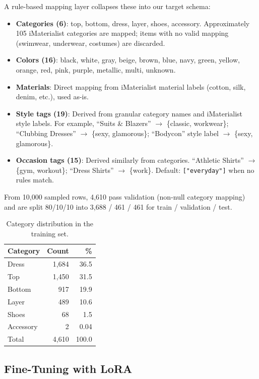\documentclass[10pt,twocolumn]{article}
\begin{document}
A rule-based mapping layer collapses these into our target schema:

\begin{itemize}[leftmargin=*,topsep=2pt,itemsep=1pt]
\item \textbf{Categories (6)}: top, bottom, dress, layer, shoes, accessory.
  Approximately 105 iMaterialist categories are mapped; items with no valid
  mapping (swimwear, underwear, costumes) are discarded.
\item \textbf{Colors (16)}: black, white, gray, beige, brown, blue, navy,
  green, yellow, orange, red, pink, purple, metallic, multi, unknown.
\item \textbf{Materials}: Direct mapping from iMaterialist material labels
  (cotton, silk, denim, etc.), used as-is.
\item \textbf{Style tags (19)}: Derived from granular category names and
  iMaterialist style labels.  For example, ``Suits \& Blazers'' $\to$
  \{classic, workwear\}; ``Clubbing Dresses'' $\to$ \{sexy, glamorous\};
  ``Bodycon'' style label $\to$ \{sexy, glamorous\}.
\item \textbf{Occasion tags (15)}: Derived similarly from categories.
  ``Athletic Shirts'' $\to$ \{gym, workout\}; ``Dress Shirts'' $\to$
  \{work\}.  Default: \texttt{["everyday"]} when no rules match.
\end{itemize}

From 10,000 sampled rows, 4,610 pass validation (non-null category mapping)
and are split 80/10/10 into 3,688 / 461 / 461 for train / validation / test.

\begin{table}[t]
\centering
\caption{Category distribution in the training set.}
\label{tab:data}
\begin{tabular}{lrr}
\toprule
Category & Count & \% \\
\midrule
Dress     & 1,684 & 36.5 \\
Top       & 1,450 & 31.5 \\
Bottom    &    917 & 19.9 \\
Layer     &    489 & 10.6 \\
Shoes     &     68 &  1.5 \\
Accessory &      2 &  0.04 \\
\midrule
Total     & 4,610 & 100.0 \\
\bottomrule
\end{tabular}
\end{table}

\subsection{Fine-Tuning with LoRA}
\end{document}

